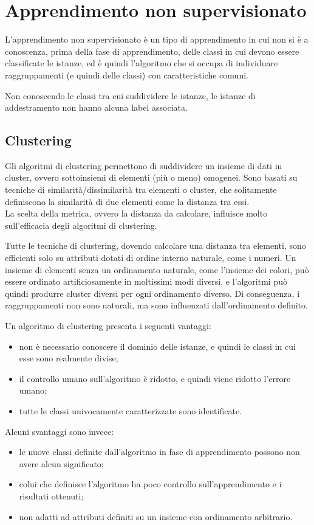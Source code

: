 \chapter{Apprendimento non supervisionato}
L'apprendimento non supervisionato è un tipo di apprendimento in cui non si è a
conoscenza, prima della fase di apprendimento, delle classi in cui devono essere
classificate le istanze, ed è quindi l'algoritmo che si occupa di individuare 
raggruppamenti (e quindi delle classi) con caratteristiche comuni.

Non conoscendo le classi tra cui suddividere le istanze, le istanze di
addestramento non hanno alcuna label associata.


\section{Clustering}
Gli algoritmi di clustering permettono di suddividere un insieme di dati in
cluster, ovvero sottoinsiemi di elementi (più o meno) omogenei.
Sono basati su tecniche di similarità/dissimilarità tra elementi o cluster,
che solitamente definiscono la similarità di due elementi come la distanza
tra essi.\\
La scelta della metrica, ovvero la distanza da calcolare, influisce molto
sull'efficacia degli algoritmi di clustering.

Tutte le tecniche di clustering, dovendo calcolare una distanza tra elementi,
sono efficienti solo su attributi dotati di ordine interno naturale, come i
numeri.
Un insieme di elementi senza un ordinamento naturale, come l'insieme dei colori,
può essere ordinato artificiosamente in moltissimi modi diversi, e l'algoritmi
può quindi produrre cluster diversi per ogni ordinamento diverso.
Di conseguenza, i raggruppamenti non sono naturali, ma sono influenzati
dall'ordinamento definito.

Un algoritmo di clustering presenta i seguenti vantaggi:
\begin{itemize}
    \item non è necessario conoscere il dominio delle istanze, e quindi le
    classi in cui esse sono realmente divise;
    \item il controllo umano sull'algoritmo è ridotto, e quindi viene
    ridotto l'errore umano;
    \item tutte le classi univocamente caratterizzate sono identificate.
\end{itemize}
Alcuni svantaggi sono invece:
\begin{itemize}
    \item le nuove classi definite dall'algoritmo in fase di apprendimento
    possono non avere alcun significato;
    \item colui che definisce l'algoritmo ha poco controllo sull'apprendimento
    e i risultati ottenuti;
    \item non adatti ad attributi definiti su un insieme con ordinamento
    arbitrario.
\end{itemize}

